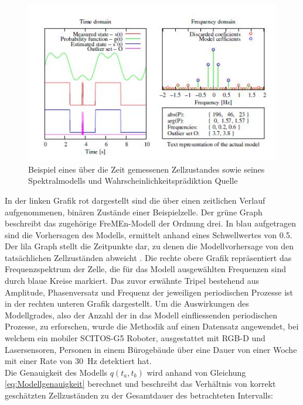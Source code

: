 \begin{figure}[!ht]
	\begin{center}
		\includegraphics[]{Abbildungen/stand_der_technik/example_of_measured_state_and_prediction}
		\caption{Beispiel eines über die Zeit gemessenen Zellzustandes sowie seines Spektralmodells und Wahrscheinlichkeitsprädiktion Quelle \cite{Krajnik.2014}}
		\label{fig.FreMEn Beispiel}
	\end{center}
\end{figure}
In der linken Grafik rot dargestellt sind die über einen zeitlichen Verlauf aufgenommenen, binären Zustände einer Beispielzelle. Der grüne Graph beschreibt das zugehörige FreMEn-Modell der Ordnung drei. In blau aufgetragen sind die Vorhersagen des Modells, ermittelt anhand eines Schwellwertes von 0.5. Der lila Graph stellt die Zeitpunkte dar, zu denen die Modellvorhersage von den tatsächlichen Zellzuständen abweicht \cite{Krajnik.2014}. Die rechte obere Grafik repräsentiert das Frequenzspektrum der Zelle, die für das Modell ausgewählten Frequenzen sind durch blaue Kreise markiert. Das zuvor erwähnte Tripel bestehend aus Amplitude, Phasenversatz und Frequenz der jeweiligen periodischen Prozesse ist in der rechten unteren Grafik dargestellt. Um die Auswirkungen des Modellgrades, also der Anzahl der in das Modell einfliessenden periodischen Prozesse, zu erforschen, wurde die Methodik auf einen Datensatz angewendet, bei welchem ein mobiler SCITOS-G5 Roboter, ausgestattet mit RGB-D und Lasersensoren, Personen in einem Bürogebäude über eine Dauer von einer Woche mit einer Rate von \SI{30}{\hertz} detektiert hat. \\
Die Genauigkeit des Modells $q(t_a,t_b)$ wird anhand von Gleichung \ref{eq:Modellgenauigkeit} berechnet und beschreibt das Verhältnis von korrekt geschätzten Zellzuständen zu der Gesamtdauer des betrachteten Intervalls:
